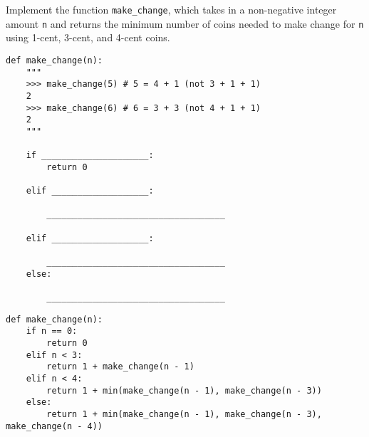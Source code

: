 \begin{blocksection}
\question 
Implement the function \lstinline{make_change}, which takes in a non-negative integer amount \lstinline{n} and returns the minimum number of coins needed to make change for \lstinline{n} using 1-cent, 3-cent, and 4-cent coins.

\begin{lstlisting}
def make_change(n):
    """
    >>> make_change(5) # 5 = 4 + 1 (not 3 + 1 + 1)
    2
    >>> make_change(6) # 6 = 3 + 3 (not 4 + 1 + 1)
    2
    """

    if _____________________:
        return 0

    elif ___________________:

        ___________________________________

    elif ___________________:

        ___________________________________
    else:

        ___________________________________
\end{lstlisting}
\end{blocksection}

\begin{blocksection}
\begin{solution}
\begin{lstlisting}
def make_change(n):
    if n == 0:
        return 0
    elif n < 3:
        return 1 + make_change(n - 1)
    elif n < 4:
        return 1 + min(make_change(n - 1), make_change(n - 3))
    else:
        return 1 + min(make_change(n - 1), make_change(n - 3), make_change(n - 4))
\end{lstlisting}
\end{solution}
\end{blocksection}

